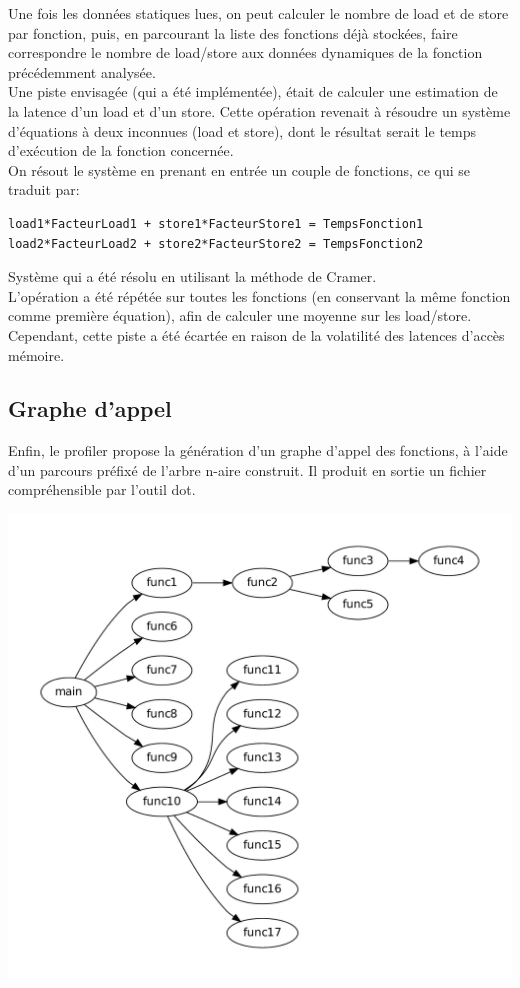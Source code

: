 Une fois les données statiques lues, on peut calculer le nombre de load et de store par fonction, puis, en parcourant la liste des fonctions déjà stockées, faire correspondre le nombre de load/store aux données dynamiques de la fonction précédemment analysée.\\

Une piste envisagée (qui a été implémentée), était de calculer une estimation de la latence d'un load et d'un store. Cette opération revenait à résoudre un système d'équations à deux inconnues (load et store), dont le résultat serait le temps d'exécution de la fonction concernée.\\
On résout le système en prenant en entrée un couple de fonctions, ce qui se traduit par:
\begin{verbatim}
load1*FacteurLoad1 + store1*FacteurStore1 = TempsFonction1
load2*FacteurLoad2 + store2*FacteurStore2 = TempsFonction2
\end{verbatim}
Système qui a été résolu en utilisant la méthode de Cramer.\\

L'opération a été répétée sur toutes les fonctions (en conservant la même fonction comme première équation), afin de calculer une moyenne sur les load/store.
Cependant, cette piste a été écartée en raison de la volatilité des latences d'accès mémoire.\\ 

\subsection{Graphe d'appel}

Enfin, le profiler propose la génération d'un graphe d'appel des fonctions, à l'aide d'un parcours préfixé de l'arbre n-aire construit. Il produit en sortie un fichier compréhensible par l'outil dot.

\begin{center}
	\includegraphics[scale=0.50]{images/CallGraph}
\end{center}


